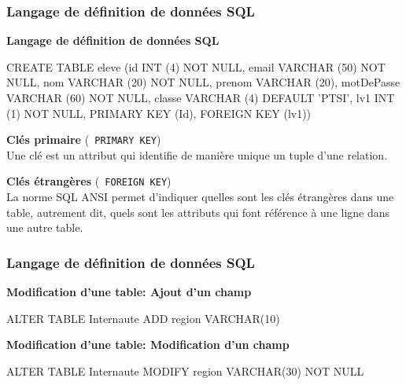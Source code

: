 \begin{frame}[fragile]
\frametitle{Langage de définition de données SQL}

\textbf{Langage de définition de données SQL}

\begin{GrayBox}[0.85\textwidth]
\begin{semiverbatim}\small
CREATE TABLE eleve (id INT (4) NOT NULL,
                    email VARCHAR (50) NOT NULL,
                    nom VARCHAR (20) NOT NULL,
                    prenom VARCHAR (20),
                    motDePasse VARCHAR (60) NOT NULL,
                    classe VARCHAR (4) DEFAULT 'PTSI',
                    lv1 INT (1) NOT NULL,
                    PRIMARY KEY (Id),
                    FOREIGN KEY (lv1))\end{semiverbatim}\end{GrayBox}

\vspace{-0.5cm}

\textbf{Clés primaire} (\verb? PRIMARY KEY?) \\
Une clé est un attribut qui identifie de manière unique un tuple d'une relation.

\textbf{Clés étrangères} (\verb? FOREIGN KEY?) \\
La norme SQL ANSI permet d'indiquer quelles sont les clés étrangères dans une table, autrement
dit, quels sont les attributs qui font référence à une ligne dans une autre table.
\end{frame}

\begin{frame}[fragile]
\frametitle{Langage de définition de données SQL}

\textbf{Modification d'une table: Ajout d'un champ}

\begin{GrayBox}[0.85\textwidth]
\begin{semiverbatim}\small
ALTER TABLE Internaute ADD region VARCHAR(10)
\end{semiverbatim}
\end{GrayBox}

\textbf{Modification d'une table: Modification d'un champ}

\begin{GrayBox}[0.85\textwidth]
\begin{semiverbatim}\small
ALTER TABLE Internaute MODIFY region VARCHAR(30) NOT NULL
\end{semiverbatim}
\end{GrayBox}

\end{frame}

